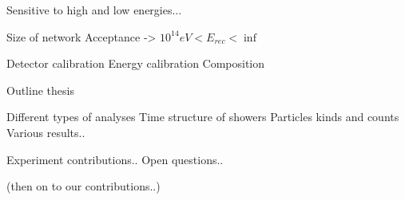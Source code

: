 Sensitive to high and low energies...

\cite{fokkema2012}


Size of network
Acceptance -> $10^{14} eV < E_{rec} < \inf$

Detector calibration
Energy calibration
Composition

Outline thesis

    Different types of analyses
    Time structure of showers
    Particles kinds and counts
    Various results..

Experiment contributions..
Open questions..

(then on to our contributions..)
